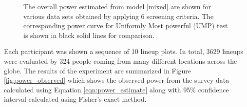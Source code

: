 \documentclass{article}
\begin{document}
\begin{figure}[hbtp]
   \centering
       \caption{The overall power estimated from model \ref{mixed} are shown for various data sets obtained by applying 6 screening criteria.  The corresponding power curve for Uniformly Most powerful (UMP) test is shown in black solid lines for comparison.}
       \label{fig:power_screening}
\end{figure}




Each participant was shown a sequence of 10 lineup plots.  In total, 3629 lineups were evaluated by 324 people coming from many different locations across the globe.  The results of the experiment are summarized in Figure \ref{fig:power_observed} which shows the observed power from the survey data calculated using Equation \ref{eqn:power_estimate} along with 95\% confidence interval calculated using Fisher's exact method.
\end{document}
